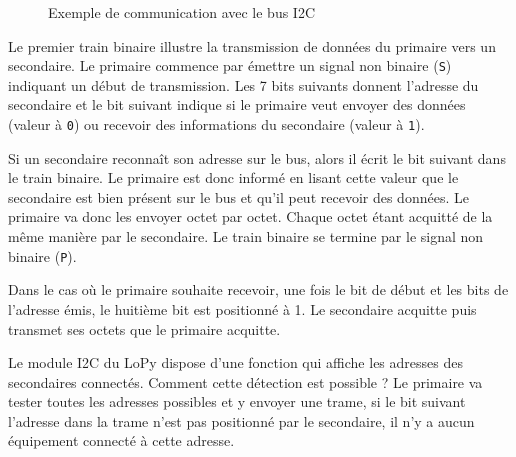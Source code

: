 \begin{figure}[!ht]


\caption{Exemple de communication avec le bus I2C} 
\label{fig-tramesI2C} 
\end{figure} 

Le premier train binaire illustre la transmission de données du primaire vers un secondaire. Le primaire commence par émettre un signal non binaire (\texttt{S}) indiquant un début de transmission. Les 7 bits suivants donnent l'adresse du secondaire et le bit suivant indique si le primaire veut envoyer des données (valeur à \texttt{0}) ou recevoir des informations du secondaire (valeur à \texttt{1}). 

Si un secondaire reconnaît son adresse sur le bus, alors il écrit le bit suivant dans le train binaire. Le primaire est donc informé en lisant cette valeur que le secondaire est bien présent sur le bus et qu'il peut recevoir des données. Le primaire va donc les envoyer octet par octet. Chaque octet étant acquitté de la même manière par le secondaire. Le train binaire se termine par le signal non binaire (\texttt{P}).

Dans le cas où le primaire souhaite recevoir, une fois le bit de début et les bits de l'adresse émis, le huitième bit est positionné à 1. Le secondaire acquitte puis transmet ses octets que le primaire acquitte.

{Le module I2C du LoPy dispose d'une fonction  qui affiche les adresses des secondaires connectés. Comment cette détection est possible ?}
{Le primaire va tester toutes les adresses possibles et y envoyer une trame, si le bit suivant l'adresse dans la trame n'est pas positionné par le secondaire, il n'y a aucun équipement connecté à cette adresse.}

